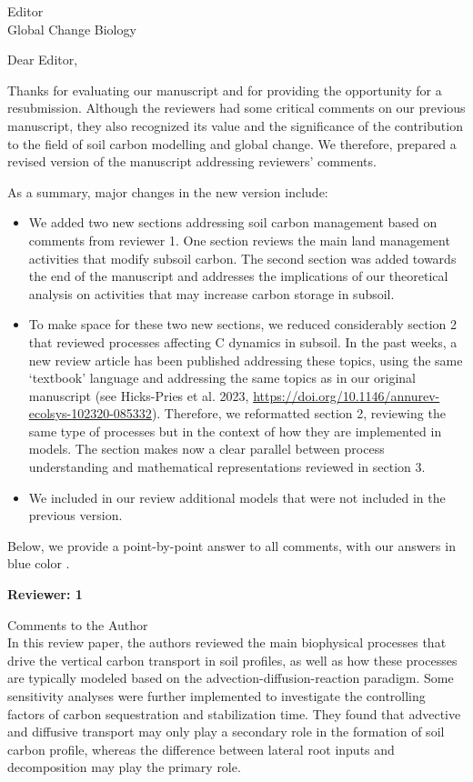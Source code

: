 \documentclass[11pt]{bgcletter}
\newcommand{\answer}[1] {
{\color{cyan} #1}
}
\begin{document}
\begin{letter}{Editor\\
   Global Change Biology
}
\opening{Dear Editor,}
Thanks for evaluating our manuscript and for providing the opportunity for a resubmission. Although the reviewers had some critical comments on our previous manuscript, they also recognized its value and the significance of the contribution to the field of soil carbon modelling and global change. We therefore, prepared a revised version of the manuscript addressing reviewers' comments. 

As a summary, major changes in the new version include: 
\begin{itemize}
\item We added two new sections addressing soil carbon management based on comments from reviewer 1. One section reviews the main land management activities that modify subsoil carbon. The second section was added towards the end of the manuscript and addresses the implications of our theoretical analysis on activities that may increase carbon storage in subsoil. 
\item To make space for these two new sections, we reduced considerably section 2 that reviewed processes affecting C dynamics in subsoil. In the past weeks, a new review article has been published addressing these topics, using the same `textbook' language and addressing the same topics as in our original manuscript (see Hicks-Pries et al. 2023, \url{https://doi.org/10.1146/annurev-ecolsys-102320-085332}). Therefore, we reformatted section 2, reviewing the same type of processes but in the context of how they are implemented in models. The section makes now a clear parallel between process understanding and mathematical representations reviewed in section 3.
\item We included in our review additional models that were not included in the previous version.
\end{itemize}

Below, we provide a point-by-point answer to all comments, with  \answer{our answers in blue color}.

\newpage

\textbf{Reviewer: 1}

Comments to the Author \\
In this review paper, the authors reviewed the main biophysical processes that drive the vertical carbon transport in soil profiles, as well as how these processes are typically modeled based on the advection-diffusion-reaction paradigm. Some sensitivity analyses were further implemented to investigate the controlling factors of carbon sequestration and stabilization time. They found that advective and diffusive transport may only play a secondary role in the formation of soil carbon profile, whereas the difference between lateral root inputs and decomposition may play the primary role.


\end{letter}
\end{document}
